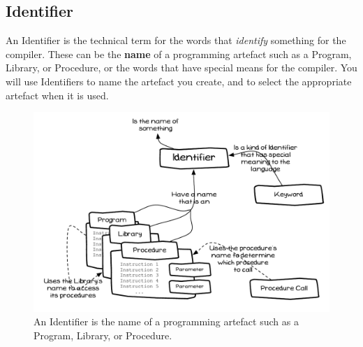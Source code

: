 \clearpage
\subsection{Identifier} %
\label{sub:identifier}

An Identifier is the technical term for the words that \emph{identify} something for the compiler. These can be the \textbf{name} of a programming artefact such as a Program, Library, or Procedure, or the words that have special means for the compiler. You will use Identifiers to name the artefact you create, and to select the appropriate artefact when it is used.

\begin{figure}[h]
   \centering
   \includegraphics[width=\textwidth]{./topics/program-creation/diagrams/Identifier} 
   \caption[Identifier Concept Diagram]{An Identifier is the name of a programming artefact such as a Program, Library, or Procedure.}
   \label{fig:program-creation-identifier}
\end{figure}



